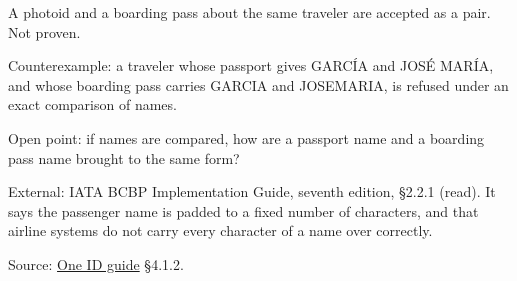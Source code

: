 \begin{theorem}
  \label{thm:same-traveler-matches}
  A photoid and a boarding pass about the same traveler are accepted as a
  pair.  Not proven.

  Counterexample: a traveler whose passport gives GARCÍA and JOSÉ MARÍA, and
  whose boarding pass carries GARCIA and JOSEMARIA, is refused under an exact
  comparison of names.

  Open point: if names are compared, how are a passport name and a boarding
  pass name brought to the same form?

  External: IATA BCBP Implementation Guide, seventh edition, §2.2.1 (read).
  It says the passenger name is padded to a fixed number of characters, and
  that airline systems do not carry every character of a name over correctly.

  Source: \href{https://standards.atlassian.net/wiki/spaces/OneID/pages/2947416082/Technical+Implementation+Guide}{One ID guide} §4.1.2.
\end{theorem}
